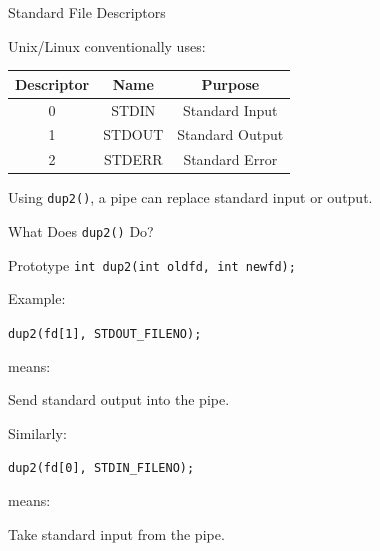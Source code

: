 \documentclass[aspectratio=169]{beamer}
\begin{document}
\begin{frame}{Standard File Descriptors}

Unix/Linux conventionally uses:

\begin{center}
\begin{tabular}{|c|c|c|}
\hline
\textbf{Descriptor} &
\textbf{Name} &
\textbf{Purpose}
\\
\hline

0 &
STDIN &
Standard Input
\\
\hline

1 &
STDOUT &
Standard Output
\\
\hline

2 &
STDERR &
Standard Error
\\
\hline

\end{tabular}
\end{center}

\vspace{0.4cm}

Using \texttt{dup2()}, a pipe can replace standard input or output.

\end{frame}

\begin{frame}{What Does \texttt{dup2()} Do?}

\begin{block}{Prototype}
\centering
\texttt{int dup2(int oldfd, int newfd);}
\end{block}

Example:

\begin{center}
\texttt{dup2(fd[1], STDOUT\_FILENO);}
\end{center}

means:

\begin{center}
Send standard output into the pipe.
\end{center}

Similarly:

\begin{center}
\texttt{dup2(fd[0], STDIN\_FILENO);}
\end{center}

means:

\begin{center}
Take standard input from the pipe.
\end{center}

\end{frame}
\end{document}
